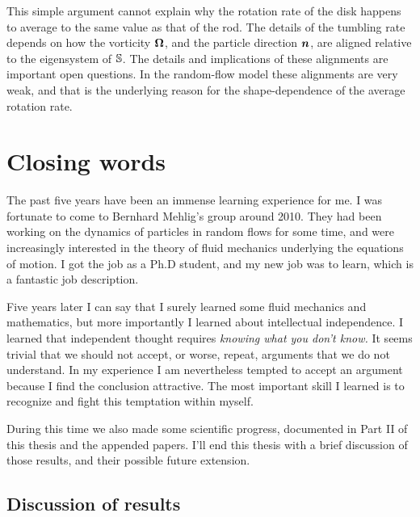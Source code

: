 \documentclass[thesis.tex]{subfiles}
\begin{document}
This simple argument cannot explain why the rotation rate of the disk happens to average to the same value as that of the rod. The details of the tumbling rate depends on how the vorticity $\mbox{\boldmath$\Omega$}$, and the particle direction $\mbox{\boldmath$n$}$, are aligned relative to the eigensystem of $\mathbb{S}$. The details and implications of these alignments are important open questions. In the random-flow model these alignments are very weak, and that is the underlying reason for the shape-dependence of the average rotation rate.

\chapter{Closing words}

The past five years have been an immense learning experience for me. I was fortunate to come to Bernhard Mehlig's group around 2010. They had been working on the dynamics of particles in random flows for some time, and were increasingly interested in the theory of fluid mechanics underlying the equations of motion. I got the job as a Ph.D student, and my new job was to learn, which is a fantastic job description.

Five years later I can say that I surely learned some fluid mechanics and mathematics, but more importantly I learned about intellectual independence. I learned that independent thought requires \emph{knowing what you don't know.} It seems trivial that we should not accept, or worse, repeat, arguments that we do not understand. In my experience I am nevertheless tempted to accept an argument because I find the conclusion attractive. The most important skill I learned is to recognize and fight this temptation within myself.

During this time we also made some scientific progress, documented in Part II of this thesis and the appended papers. I'll end this thesis with a brief discussion of those results, and their possible future extension.

\section{Discussion of results}
\end{document}
